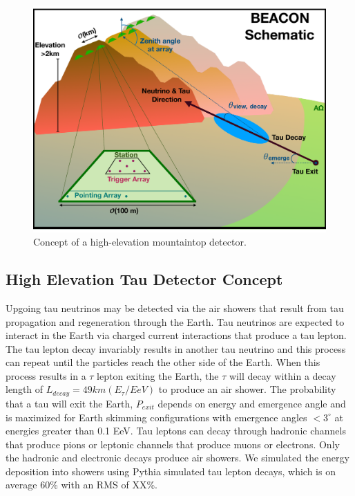 \documentclass{PoS}
\begin{document}
\begin{figure}[htbp]
\begin{center}
\includegraphics[width=\textwidth]{figures/BEACON_ICRC_Concept.pdf}
\caption{Concept of a high-elevation mountaintop detector.}
\label{fig:concept}
\end{center}
\end{figure}

\subsection{High Elevation Tau Detector Concept}

Upgoing tau neutrinos may be detected via the air showers that result from tau propagation and regeneration through the Earth. Tau neutrinos are expected to interact in the Earth via charged current interactions that produce a tau lepton.%
The tau lepton decay invariably results in another tau neutrino and this process can repeat until the particles reach the other side of the Earth. When this process results in a $\tau$ lepton exiting the Earth, the $\tau$ will decay within a decay length of $L_{decay} = 49 km (E_\tau/EeV)$ to produce an air shower. The probability that a tau will exit the Earth, $P_{exit}$ depends on energy and emergence angle and is maximized for Earth skimming configurations with emergence angles $<3^{\circ}$ at energies greater than 0.1 EeV.  Tau leptons can decay through hadronic channels that produce pions or leptonic channels that produce muons or electrons. Only the hadronic and electronic decays produce air showers. We simulated the energy deposition into showers using Pythia simulated tau lepton decays, which is on average 60\% with an RMS of XX\%. 
\end{document}
